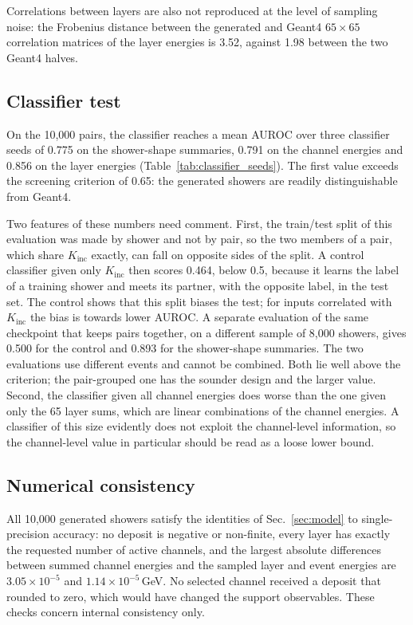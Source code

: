 \documentclass[11pt]{article}
\newcommand{\Kinc}{K_{\mathrm{inc}}}
\begin{document}
Correlations between layers are also not reproduced at the level of sampling noise: the Frobenius distance between the generated and Geant4 $65\times65$ correlation matrices of the layer energies is 3.52, against 1.98 between the two Geant4 halves.

\subsection{Classifier test}

On the 10,000 pairs, the classifier reaches a mean AUROC over three classifier seeds of 0.775 on the shower-shape summaries, 0.791 on the channel energies and 0.856 on the layer energies (Table~\ref{tab:classifier_seeds}). The first value exceeds the screening criterion of 0.65: the generated showers are readily distinguishable from Geant4.

Two features of these numbers need comment. First, the train/test split of this evaluation was made by shower and not by pair, so the two members of a pair, which share $\Kinc$ exactly, can fall on opposite sides of the split. A control classifier given only $\Kinc$ then scores 0.464, below 0.5, because it learns the label of a training shower and meets its partner, with the opposite label, in the test set. The control shows that this split biases the test; for inputs correlated with $\Kinc$ the bias is towards lower AUROC. A separate evaluation of the same checkpoint that keeps pairs together, on a different sample of 8,000 showers, gives 0.500 for the control and 0.893 for the shower-shape summaries. The two evaluations use different events and cannot be combined. Both lie well above the criterion; the pair-grouped one has the sounder design and the larger value. Second, the classifier given all channel energies does worse than the one given only the 65 layer sums, which are linear combinations of the channel energies. A classifier of this size evidently does not exploit the channel-level information, so the channel-level value in particular should be read as a loose lower bound.

\subsection{Numerical consistency}

All 10,000 generated showers satisfy the identities of Sec.~\ref{sec:model} to single-precision accuracy: no deposit is negative or non-finite, every layer has exactly the requested number of active channels, and the largest absolute differences between summed channel energies and the sampled layer and event energies are $3.05\times10^{-5}$ and $1.14\times10^{-5}$\,GeV. No selected channel received a deposit that rounded to zero, which would have changed the support observables. These checks concern internal consistency only.
\end{document}
